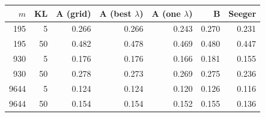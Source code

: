 \begin{tabular}{rrrrrrr}
\toprule
$m$ & KL & A (grid) & A (best $\lambda$) & A (one $\lambda$) & B & Seeger \\
\midrule
195 & 5 & 0.266 & 0.266 & 0.243 & 0.270 & 0.231 \\
195 & 50 & 0.482 & 0.478 & 0.469 & 0.480 & 0.447 \\
930 & 5 & 0.176 & 0.176 & 0.166 & 0.181 & 0.155 \\
930 & 50 & 0.278 & 0.273 & 0.269 & 0.275 & 0.236 \\
9644 & 5 & 0.124 & 0.124 & 0.120 & 0.126 & 0.116 \\
9644 & 50 & 0.154 & 0.154 & 0.152 & 0.155 & 0.136 \\
\bottomrule
\end{tabular}
